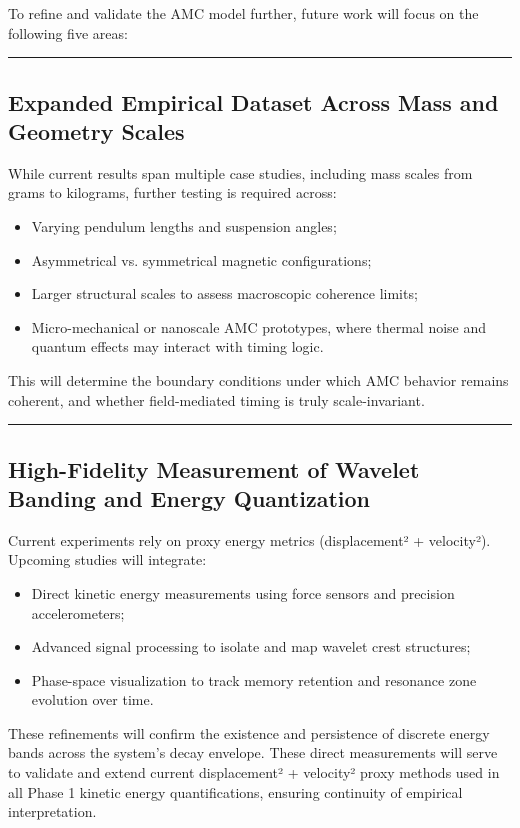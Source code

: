 \documentclass[10pt,aps,pre,onecolumn,superscriptaddress,notitlepage]{revtex4-2}
\begin{document}
To refine and validate the AMC model further, future work will focus on the following five areas:
\vspace{1em}
\hrule
\vspace{1em}

\subsection{Expanded Empirical Dataset Across Mass and Geometry Scales}

While current results span multiple case studies, including mass scales from grams to kilograms, further testing is required across:
\begin{itemize}
    \item Varying pendulum lengths and suspension angles;
    \item Asymmetrical vs. symmetrical magnetic configurations;
    \item Larger structural scales to assess macroscopic coherence limits;
    \item Micro-mechanical or nanoscale AMC prototypes, where thermal noise and quantum effects may interact with timing logic.
\end{itemize}

This will determine the boundary conditions under which AMC behavior remains coherent, and whether field-mediated timing is truly scale-invariant. 
\vspace{1em}
\hrule
\vspace{1em}

\subsection{High-Fidelity Measurement of Wavelet Banding and Energy Quantization}
Current experiments rely on proxy energy metrics (displacement² + velocity²). Upcoming studies will integrate:
\begin{itemize}
    \item Direct kinetic energy measurements using force sensors and precision accelerometers;
    \item Advanced signal processing to isolate and map wavelet crest structures;
    \item Phase-space visualization to track memory retention and resonance zone evolution over time.
\end{itemize}

These refinements will confirm the existence and persistence of discrete energy bands across the system's decay envelope. These direct measurements will serve to validate and extend current displacement² + velocity² proxy methods used in all Phase 1 kinetic energy quantifications, ensuring continuity of empirical interpretation.  
\end{document}
